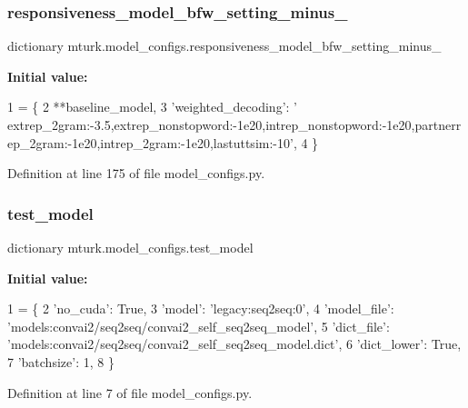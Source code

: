 \subsubsection{\texorpdfstring{responsiveness\+\_\+model\+\_\+bfw\+\_\+setting\+\_\+minus\+\_}{responsiveness\_model\_bfw\_setting\_minus\_10}}
{\footnotesize\ttfamily dictionary mturk.\+model\+\_\+configs.\+responsiveness\+\_\+model\+\_\+bfw\+\_\+setting\+\_\+minus\+\_}

{\bfseries Initial value\+:}
\begin{DoxyCode}
1 =  \{
2     **baseline\_model,
3     \textcolor{stringliteral}{'weighted\_decoding'}: \textcolor{stringliteral}{'
      extrep\_2gram:-3.5,extrep\_nonstopword:-1e20,intrep\_nonstopword:-1e20,partnerrep\_2gram:-1e20,intrep\_2gram:-1e20,lastuttsim:-10'},
4 \}
\end{DoxyCode}


Definition at line 175 of file model\+\_\+configs.\+py.

\mbox{\label{namespacemturk_1_1model__configs_a7c452427f1efdf487b85b26dbd55b422}} 
\subsubsection{\texorpdfstring{test\+\_\+model}{test\_model}}
{\footnotesize\ttfamily dictionary mturk.\+model\+\_\+configs.\+test\+\_\+model}

{\bfseries Initial value\+:}
\begin{DoxyCode}
1 =  \{
2     \textcolor{stringliteral}{'no\_cuda'}: \textcolor{keyword}{True},
3     \textcolor{stringliteral}{'model'}: \textcolor{stringliteral}{'legacy:seq2seq:0'},
4     \textcolor{stringliteral}{'model\_file'}: \textcolor{stringliteral}{'models:convai2/seq2seq/convai2\_self\_seq2seq\_model'},
5     \textcolor{stringliteral}{'dict\_file'}: \textcolor{stringliteral}{'models:convai2/seq2seq/convai2\_self\_seq2seq\_model.dict'},
6     \textcolor{stringliteral}{'dict\_lower'}: \textcolor{keyword}{True},
7     \textcolor{stringliteral}{'batchsize'}: 1,
8 \}
\end{DoxyCode}


Definition at line 7 of file model\+\_\+configs.\+py.

